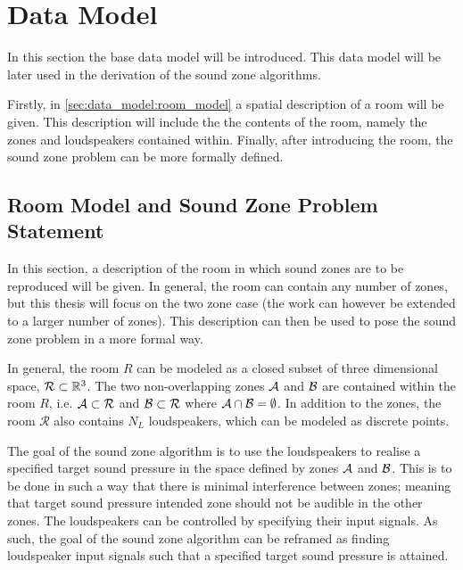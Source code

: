 \section{Data Model}
\label{sec:data_model}
In this section the base data model will be introduced.
This data model will be later used in the derivation of the sound zone algorithms.

Firstly, in \autoref{sec:data_model:room_model} a spatial description of a room will be given.
This description will include the the contents of the room, namely the zones and loudspeakers contained within.
Finally, after introducing the room, the sound zone problem can be more formally defined.


\subsection{Room Model and Sound Zone Problem Statement}
\label{sec:data_model:room_model}
In this section, a description of the room in which sound zones are to be reproduced will be given.
In general, the room can contain any number of zones, but this thesis will focus on the two zone case 
(the work can however be extended to a larger number of zones).
This description can then be used to pose the sound zone problem in a more formal way.

In general, the room $R$ can be modeled as a closed subset of three dimensional space, $\mathcal{R} \subset \mathbb{R}^{3}$.
The two non-overlapping zones $\mathcal{A}$ and $\mathcal{B}$ are contained within the room $R$, 
i.e. $\mathcal{A} \subset \mathcal{R}$ and $\mathcal{B} \subset \mathcal{R}$ where $\mathcal{A} \cap \mathcal{B} = \emptyset$.
In addition to the zones, the room $\mathcal{R}$ also contains $N_L$ loudspeakers, which can be modeled as discrete points.

\begin{figure}[htb]
    \centering
    
\end{figure}

The goal of the sound zone algorithm is to use the loudspeakers to realise a specified target sound pressure
in the space defined by zones $\mathcal{A}$ and $\mathcal{B}$.
This is to be done in such a way that there is minimal interference between zones; 
meaning that target sound pressure intended zone should not be audible in the other zones.
The loudspeakers can be controlled by specifying their input signals.
As such, the goal of the sound zone algorithm can be reframed as finding loudspeaker input signals such that a specified target sound pressure is attained.

